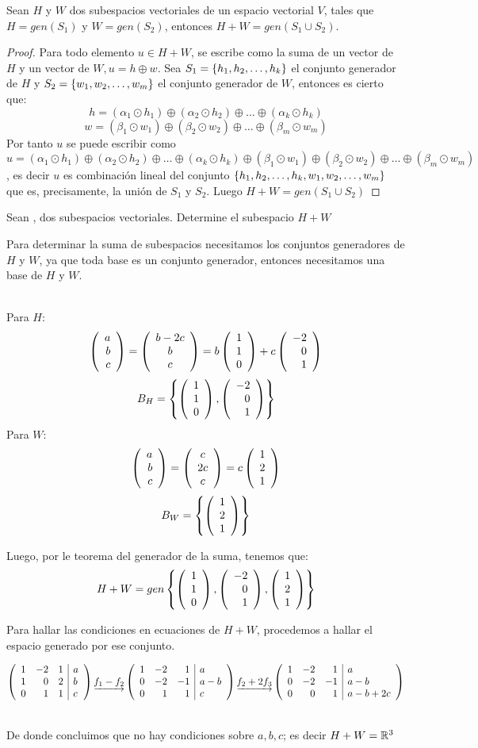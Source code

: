 \begin{theorem}
Sean $H$ y $W$ dos subespacios vectoriales de un espacio vectorial $V$, tales que $H = gen(S_1)$ y $W = gen(S_2)$, entonces $H+W = gen(S_1 \cup S_2)$.
\end{theorem}
\begin{proof}
Para todo elemento $u \in H+W$, se escribe como la suma de un vector de $H$ y un vector de $W, u = h \oplus w$. Sea $S_1 = \conjvect{h}{k}$ el conjunto generador de $H$ y $S_2 = \conjvect{w}{m}$ el conjunto generador de $W$, entonces es cierto que:
$$h = (\alpha_1 \odot h_1) \oplus (\alpha_2 \odot h_2) \oplus \hdots \oplus (\alpha_k \odot h_k)$$
$$w = (\beta_1 \odot w_1) \oplus (\beta_2 \odot w_2) \oplus \hdots \oplus (\beta_m \odot w_m)$$
Por tanto $u$ se puede escribir como $u = (\alpha_1 \odot h_1) \oplus (\alpha_2 \odot h_2) \oplus \hdots \oplus (\alpha_k \odot h_k) \oplus (\beta_1 \odot w_1) \oplus (\beta_2 \odot w_2) \oplus \hdots \oplus (\beta_m \odot w_m)$, es decir $u$ es combinación lineal del conjunto $\llav{h_1, h_2, \hdots, h_k, w_1, w_2, \hdots, w_m}$ que es, precisamente, la unión de $S_1$ y $S_2$. Luego $H+W = gen(S_1 \cup S_2)$
\end{proof}

\begin{ejemplo}
Sean ,  dos subespacios vectoriales. Determine el subespacio $H+W$
\end{ejemplo}
\begin{sol}
Para determinar la suma de subespacios necesitamos los conjuntos generadores de $H$ y $W$, ya que toda base es un conjunto generador, entonces necesitamos una base de $H$ y $W$.

~\\Para $H$:
$$\vectrtres{a}{b}{c} = \vectrtrescent{b-2c}{b}{c} = b\vectrtres{1}{1}{0} + c\vectrtres{-2}{0}{1}$$
$$B_H = \llav{\vectrtres{1}{1}{0},\vectrtres{-2}{0}{1}}$$
Para $W$:
$$\vectrtres{a}{b}{c} = \vectrtrescent{c}{2c}{c} = c\vectrtres{1}{2}{1}$$
$$B_W = \llav{\vectrtres{1}{2}{1}}$$

Luego, por le teorema del generador de la suma, tenemos que:
$$H+W = gen\llav{\vectrtres{1}{1}{0},\vectrtres{-2}{0}{1},\vectrtres{1}{2}{1}}$$

Para hallar las condiciones en ecuaciones de $H+W$, procedemos a hallar el espacio generado por ese conjunto.

$$\reducir{rrr|l}{1&-2&1&a\\1&0&2&b\\0&1&1&c} 
\underrightarrow{f_1 - f_2}
\reducir{rrr|l}{1&-2&1&a\\0&-2&-1&a-b\\0&1&1&c} 
\underrightarrow{f_2 + 2f_3}
\reducir{rrr|l}{1&-2&1&a\\0&-2&-1&a-b\\0&0&1&a-b+2c}$$

~\\De donde concluimos que no hay condiciones sobre $a,b,c$; es decir $H+W = \rtres$
\end{sol}

